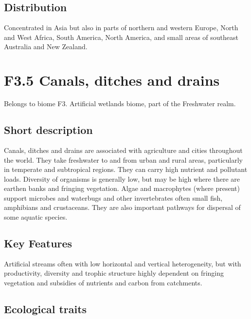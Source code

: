 \documentclass[
  letterpaper,
  DIV=11,
  numbers=noendperiod]{scrartcl}
\begin{document}
\subsection{Distribution}\label{distribution-20}

Concentrated in Asia but also in parts of northern and western Europe,
North and West Africa, South America, North America, and small areas of
southeast Australia and New Zealand.

\section{F3.5 Canals, ditches and
drains}\label{f3.5-canals-ditches-and-drains}

Belongs to biome F3. Artificial wetlands biome, part of the Freshwater
realm.

\subsection{Short description}\label{short-description-21}

Canals, ditches and drains are associated with agriculture and cities
throughout the world. They take freshwater to and from urban and rural
areas, particularly in temperate and subtropical regions. They can carry
high nutrient and pollutant loads. Diversity of organisms is generally
low, but may be high where there are earthen banks and fringing
vegetation. Algae and macrophytes (where present) support microbes and
waterbugs and other invertebrates often small fish, amphibians and
crustaceans. They are also important pathways for dispersal of some
aquatic species.

\subsection{Key Features}\label{key-features-21}

Artificial streams often with low horizontal and vertical heterogeneity,
but with productivity, diversity and trophic structure highly dependent
on fringing vegetation and subsidies of nutrients and carbon from
catchments.

\subsection{Ecological traits}\label{ecological-traits-21}
\end{document}
